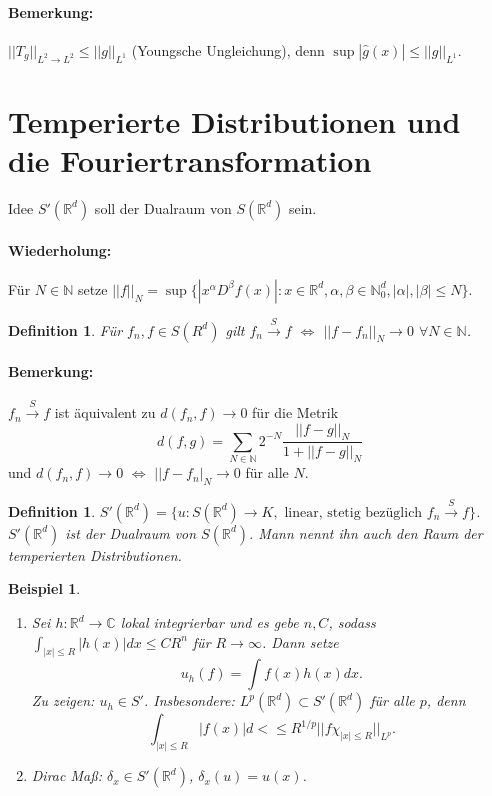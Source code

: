 \documentclass[11pt,a4paper,titlepage, ngerman]{scrartcl}
\newtheorem{Definition}[Satz]{Definition}
\newtheorem{Beispiel}[Satz]{Beispiel}
\numberwithin{equation}{section}
\newcommand{\C}{\mathbb{C}} %
\newcommand{\R}{\mathbb{R}} %
\newcommand{\N}{\mathbb{N}} %
\newcommand{\g}{\hat{g}}
\begin{document}
	\paragraph{Bemerkung:} $||T_g||_{L^2\rightarrow L^2}\leq||g||_{L^1}$ (Youngsche Ungleichung), denn $\sup|\g(x)| \leq ||g||_{L^1}$.
	
	\section{Temperierte Distributionen und die Fouriertransformation}
	
	Idee $S'(\R^d)$ soll der Dualraum von $S(\R^d)$ sein. 
	\paragraph{Wiederholung:} Für $N\in \N$ setze $||f||_N = \sup\{|x^\alpha D^\beta f(x)|: x\in \R^d, \alpha,\beta\in \N_0^d, |\alpha|,|\beta|\leq N \}$.
	
	\begin{Definition}
		Für $f_n,f\in S(R^d)$ gilt $f_n\overset{S}{\rightarrow}f$ $\Leftrightarrow$ $||f-f_n||_N\rightarrow 0$ $\forall N\in \N$.
	\end{Definition}
	
	\paragraph{Bemerkung:} $f_n\overset{S}{\rightarrow} f$ ist äquivalent zu $d(f_n,f)\rightarrow 0$ für die Metrik
	$$d(f,g)=\sum_{N\in \N}2^{-N}\frac{||f-g||_N}{1+||f-g||_N}$$
	und $d(f_n,f)\rightarrow 0$ $\Leftrightarrow$ $||f-f_n|_N\rightarrow 0$ für alle $N$.
	
	\begin{Definition}
		$S'(\R^d) = \{u:S(\R^d)\rightarrow K, \text{ linear, stetig bezüglich } f_n\overset{S}{\rightarrow} f \}$. $S'(\R^d)$ ist der Dualraum von $S(\R^d)$. Mann nennt ihn auch den Raum der temperierten Distributionen.
	\end{Definition}
	
	\begin{Beispiel}
		~
		\begin{enumerate}
			\item[a)] Sei $h:\R^d\rightarrow \C$ lokal integrierbar und es gebe $n,C$, sodass $\int_{|x|\leq R}|h(x)|dx\leq C R^n$ für $R\rightarrow \infty$. Dann setze $$u_h(f) = \int f(x)h(x) dx.$$
			Zu zeigen: $u_h\in S'$. Insbesondere: $L^p(\R^d)\subset S'(\R^d)$ für alle $p$, denn 
			$$\int_{|x|\leq R}|f(x)|d<\leq R^{1/p}||f\chi_{|x|\leq R}||_{L^p}.$$
			\item[b)] Dirac Maß: $\delta_x\in S'(\R^d)$, $\delta_x(u) = u(x)$.
		\end{enumerate}
	\end{Beispiel}
	
\end{document}
